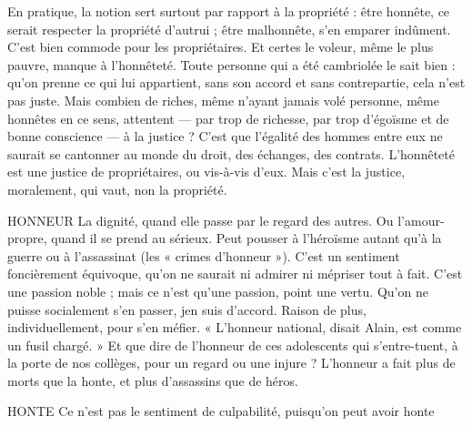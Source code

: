 En pratique, la notion sert surtout par rapport à la propriété : être honnête,
ce serait respecter la propriété d’autrui ; être malhonnête, s’en emparer indûment.
C’est bien commode pour les propriétaires. Et certes le voleur, même le
plus pauvre, manque à l'honnêteté. Toute personne qui a été cambriolée le sait
bien : qu’on prenne ce qui lui appartient, sans son accord et sans contrepartie,
cela n’est pas juste. Mais combien de riches, même n’ayant jamais volé personne,
même honnêtes en ce sens, attentent — par trop de richesse, par trop
d’égoïsme et de bonne conscience — à la justice ? C’est que l'égalité des hommes
entre eux ne saurait se cantonner au monde du droit, des échanges, des
contrats. L’honnêteté est une justice de propriétaires, ou vis-à-vis d'eux. Mais
c’est la justice, moralement, qui vaut, non la propriété.

HONNEUR La dignité, quand elle passe par le regard des autres. Ou
l’amour-propre, quand il se prend au sérieux. Peut pousser à
l’héroïsme autant qu’à la guerre ou à l'assassinat (les « crimes d’honneur »).
C’est un sentiment foncièrement équivoque, qu’on ne saurait ni admirer ni
mépriser tout à fait. C’est une passion noble ; mais ce n’est qu’une passion,
point une vertu. Qu’on ne puisse socialement s’en passer, jen suis d’accord.
Raison de plus, individuellement, pour s’en méfier. « L’honneur national,
disait Alain, est comme un fusil chargé. » Et que dire de l’honneur de ces adolescents
qui s’entre-tuent, à la porte de nos collèges, pour un regard ou une
injure ? L’honneur a fait plus de morts que la honte, et plus d’assassins que de
héros.

HONTE Ce n’est pas le sentiment de culpabilité, puisqu’on peut avoir honte

